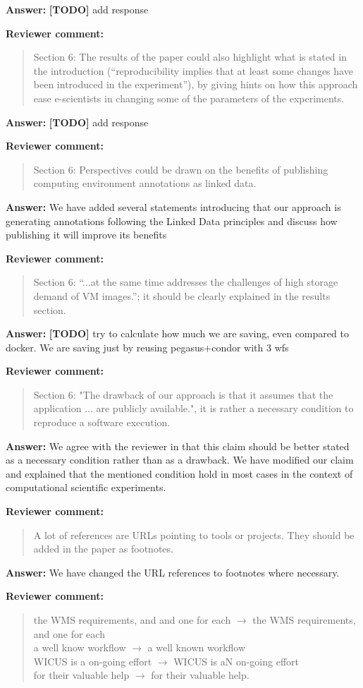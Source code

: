 \documentclass{letter}
\newenvironment{review}%
{\textbf{Reviewer comment:}\begin{quote}}%
{\end{quote}}%
\newcommand{\todo}[1]{%
      \color{red}\textbf{[TODO]} #1\color{black}}
\newcommand{\answer}[1]{%
      \textbf{Answer:} #1}
\begin{document}
\begin{letter}{}
\answer{\todo{add response}}


\begin{review}
Section 6: The results of the paper could also highlight what is stated in the introduction (``reproducibility implies that at least some changes have been introduced in the experiment''), by giving hints on how this approach ease e-scientists in changing some of the parameters of the experiments.
\end{review}

\answer{\todo{add response}}


\begin{review}
Section 6: Perspectives could be drawn on the benefits of publishing computing environment annotations as linked data.
\end{review}

\answer{We have added several statements introducing that our approach is generating annotations following the Linked Data principles and discuss how publishing it will improve its benefits}

\begin{review}
Section 6: ``...at the same time addresses the challenges of high storage demand of VM images.''; it should be clearly explained in the results section.
\end{review}

\answer{\todo{try to calculate how much we are saving, even compared to docker. We are saving just by reusing pegasus+condor with 3 wfs}}


\begin{review}
Section 6: "The drawback of our approach is that it assumes that the application ...  are publicly available.", it is rather a necessary condition to reproduce a software execution.
\end{review}

\answer{We agree with the reviewer in that this claim should be better stated as a necessary condition rather than as a drawback. We have modified our claim and explained that the mentioned condition hold in most cases in the context of computational scientific experiments. }


\begin{review}
A lot of references are URLs pointing to tools or projects. They should be added in the paper as footnotes.
\end{review}

\answer{We have changed the URL references to footnotes where necessary.}


\begin{review}
the WMS requirements, and and one for each $\rightarrow$ the WMS requirements, and one for each \\
a well know workflow $\rightarrow$ a well known workflow \\
WICUS is a on-going effort $\rightarrow$ WICUS is aN on-going effort \\
for their valuable help $\rightarrow$ for their valuable help.
\end{review}


\end{letter}
\end{document}
